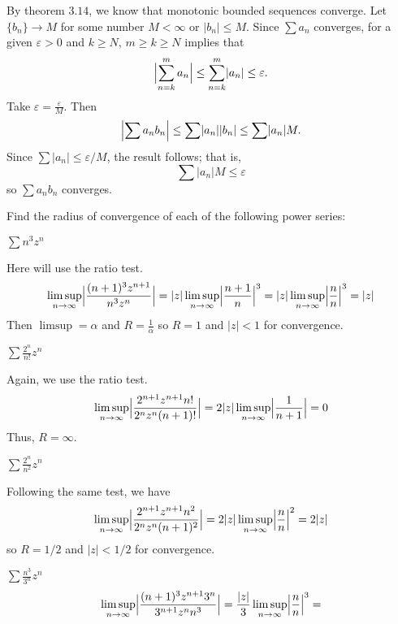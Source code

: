 \begin{exercise}
  \par\smallskip
  By theorem \(3.14\), we know that monotonic bounded sequences converge.
  Let \(\{b_n\}\to M\) for some number \(M < \infty\) or
  \(\lvert b_n\rvert\leq M\).
  Since \(\sum a_n\) converges, for a given \(\varepsilon > 0\) and \(k\geq N\),
  \(m\geq k\geq N\) implies that
  \[
  \Bigl\lvert\sum_{n = k}^ma_n\Bigr\rvert\leq\sum_{n = k}^m\lvert a_n\rvert\leq
  \varepsilon.
  \]
  Take \(\varepsilon = \frac{\varepsilon}{M}\).
  Then
  \[
  \Bigl\lvert\sum a_nb_n\Bigr\rvert\leq\sum\lvert a_n\rvert\lvert b_n\rvert\leq
  \sum\lvert a_n\rvert M.
  \]
  Since \(\sum\lvert a_n\rvert\leq\varepsilon/M\), the result follows; that is,
  \[
  \sum\lvert a_n\rvert M\leq\varepsilon
  \]
  so \(\sum a_nb_n\) converges.
\item
  Find the radius of convergence of each of the following power series:
  \begin{exercise}[label = (\alph*)]
  \item
    \(\sum n^3z^n\)
    \par\smallskip
    Here will use the ratio test.
    \[
    \limsup_{n\to\infty}\Bigl\lvert\frac{(n + 1)^3z^{n + 1}}{n^3z^n}\Bigr\rvert
    = \lvert z\rvert\limsup_{n\to\infty}\Bigl\lvert\frac{n + 1}{n}\Bigr\rvert^3
    = \lvert z\rvert\limsup_{n\to\infty}\Bigl\lvert\frac{n}{n}\Bigr\rvert^3 =
    \lvert z\rvert
    \]
    Then \(\limsup = \alpha\) and \(R = \frac{1}{\alpha}\) so \(R = 1\) and
    \(\lvert z\rvert < 1\) for convergence.
  \item
    \(\sum\frac{2^n}{n!}z^n\)
    \par\smallskip
    Again, we use the ratio test.
    \[
    \limsup_{n\to\infty}\Bigl\lvert
    \frac{2^{n + 1}z^{n + 1}n!}{2^nz^n(n + 1)!}\Bigr\rvert =
    2\lvert z\rvert\limsup_{n\to\infty}\Bigl\lvert\frac{1}{n + 1}\Bigr\rvert =
    0
    \]
    Thus, \(R = \infty\).
  \item
    \(\sum\frac{2^n}{n^2}z^n\)
    \par\smallskip
    Following the same test, we have
    \[
    \limsup_{n\to\infty}\Bigl\lvert
    \frac{2^{n + 1}z^{n + 1}n^2}{2^nz^n(n + 1)^2}\Bigr\rvert =
    2\lvert z\rvert\limsup_{n\to\infty}\Bigl\lvert\frac{n}{n}\Bigr\rvert^2 =
    2\lvert z\rvert
    \]
    so \(R = 1/2\) and \(\lvert z\rvert < 1/2\) for convergence.
  \item
    \(\sum\frac{n^3}{3^n}z^n\)
    \[
    \limsup_{n\to\infty}\Bigl\lvert
    \frac{(n + 1)^3z^{n + 1}3^n}{3^{n + 1}z^nn^3}\Bigr\rvert =
    \frac{\lvert z\rvert}{3}
    \limsup_{n\to\infty}\Bigl\lvert\frac{n}{n}\Bigr\rvert^3 =
\]
\end{exercise}
\end{exercise}
